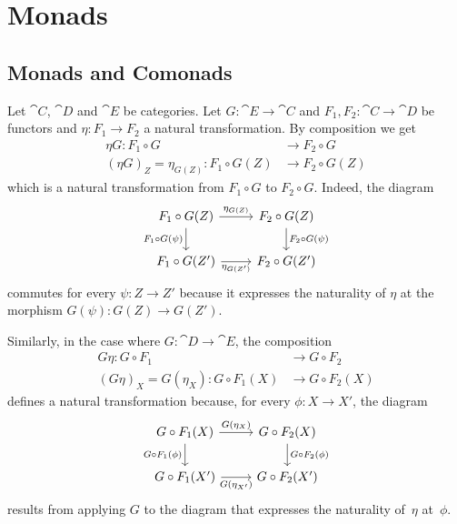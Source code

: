 \chapter{Monads}

\section{Monads and Comonads}

Let $\cat C$, $\cat D$ and $\cat E$ be categories. Let $G\colon\cat E\to\cat C$ and $F_1,F_2\colon \cat C\to\cat D$ be functors and $\eta\colon F_1\to F_2$ a natural transformation. By composition we get
\begin{align*}
    \eta G\colon F_1\circ G&\to F_2\circ G\\
        (\eta G)_Z = \eta_{G(Z)}\colon F_1\circ G(Z)&\to F_2\circ G(Z)
\end{align*}
which is a natural transformation from $F_1\circ G$ to $F_2\circ G$. Indeed, the diagram
$$
    \begin{tikzcd}
        F_1\circ G(Z)
            \arrow[r,"\eta_{G(Z)}"]
            \arrow[d,"F_1\circ G(\psi)"']
        &F_2\circ G(Z)
            \arrow[d,"F_2\circ G(\psi)"]\\
        F_1\circ G(Z')
            \arrow[r,"\eta_{G(Z')}"']
        &F_2\circ G(Z')
    \end{tikzcd}
$$
commutes for every $\psi\colon Z\to Z'$ because it expresses the naturality of $\eta$ at the morphism $G(\psi)\colon G(Z)\to G(Z')$.

Similarly, in the case where $G\colon\cat D\to\cat E$, the composition
\begin{align*}
    G\eta\colon G\circ F_1&\to G\circ F_2\\
    (G\eta)_X=G(\eta_X)\colon G\circ F_1(X)&\to G\circ F_2(X)
\end{align*}
defines a natural transformation because, for every $\phi\colon X\to X'$, the diagram
$$
    \begin{tikzcd}
        G\circ F_1(X)
                \arrow[r,"G(\eta_X)"]
                \arrow[d,"G\circ F_1(\phi)"']
            &G\circ F_2(X)
                \arrow[d,"G\circ F_2(\phi)"]\\
        G\circ F_1(X')
            \arrow[r,"G(\eta_{X'})"']
        &G\circ F_2(X')
    \end{tikzcd}
$$
results from applying $G$ to the diagram that expresses the naturality of~$\eta$ at~$\phi$.

